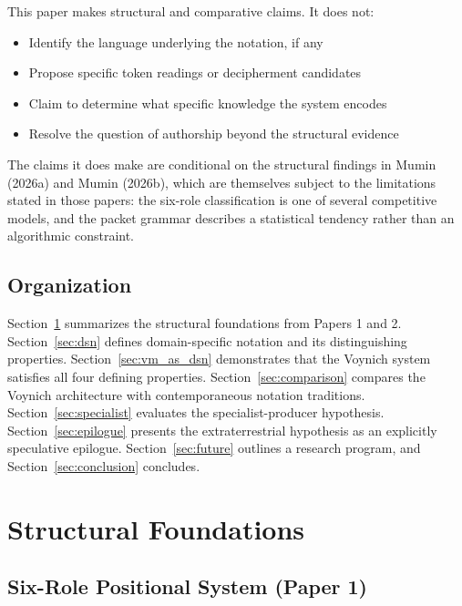 \documentclass[11pt,a4paper,twocolumn]{article}
\begin{document}
This paper makes structural and comparative claims. It does not:

\begin{itemize}[leftmargin=*,itemsep=2pt]
    \item Identify the language underlying the notation, if any
    \item Propose specific token readings or decipherment candidates
    \item Claim to determine what specific knowledge the system encodes
    \item Resolve the question of authorship beyond the structural evidence
\end{itemize}

\noindent The claims it does make are conditional on the structural findings in Mumin (2026a) and Mumin (2026b), which are themselves subject to the limitations stated in those papers: the six-role classification is one of several competitive models, and the packet grammar describes a statistical tendency rather than an algorithmic constraint.

\subsection{Organization}

Section~\ref{sec:structural} summarizes the structural foundations from Papers 1 and 2. Section~\ref{sec:dsn} defines domain-specific notation and its distinguishing properties. Section~\ref{sec:vm_as_dsn} demonstrates that the Voynich system satisfies all four defining properties. Section~\ref{sec:comparison} compares the Voynich architecture with contemporaneous notation traditions. Section~\ref{sec:specialist} evaluates the specialist-producer hypothesis. Section~\ref{sec:epilogue} presents the extraterrestrial hypothesis as an explicitly speculative epilogue. Section~\ref{sec:future} outlines a research program, and Section~\ref{sec:conclusion} concludes.

\section{Structural Foundations}
\label{sec:structural}

\subsection{Six-Role Positional System (Paper 1)}
\end{document}
